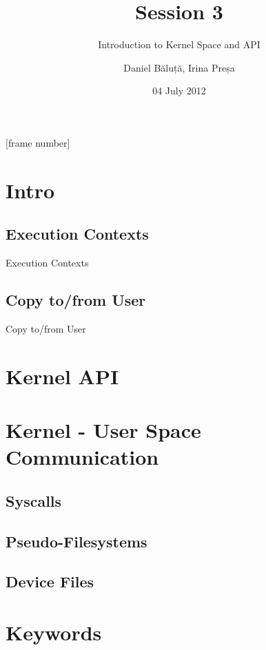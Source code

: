 \documentclass{workshop}
\title[Session 3]{Session 3}
\subtitle{Introduction to Kernel Space and API}
\author{Daniel Băluță, Irina Preșa}
\date{04 July 2012}
\begin{document}
[frame number]

\frame{\titlepage}

\section{Intro}

\subsection{Execution Contexts}
\begin{frame}{Execution Contexts}
\end{frame}

\subsection{Copy to/from User}
\begin{frame}{Copy to/from User}
\end{frame}

\section{Kernel API}

\section{Kernel - User Space Communication}

\subsection{Syscalls}

\subsection{Pseudo-Filesystems}

\subsection{Device Files}

\section{Keywords}
\end{document}
